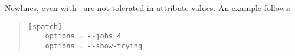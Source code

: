 Newlines, even with \, are not tolerated in attribute values. An example
follows:

\begin{quote}
\begin{verbatim}
[spatch]
	options = --jobs 4
	options = --show-trying
\end{verbatim}
\end{quote}

